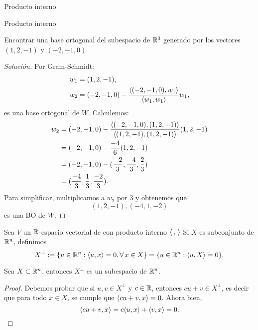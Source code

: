 \begin{chapter}{Producto interno}
\begin{section}{Producto interno}
        \begin{ejemplo*}
            Encontrar una base ortogonal del subespacio de $\mathbb R^3$ generado por los vectores $(1,2,-1)$ y $(-2,-1,0)$
            \begin{proof}[Solución] Por Gram-Schmidt:
                \begin{align*}
                w_1 &= (1,2,-1),  \\
                w_2 &= (-2,-1,0) - \frac{\langle (-2,-1,0),w_1\rangle}{\langle w_1,w_1\rangle}w_1,
                \end{align*}
                es una base ortogonal de $W$. Calculemos: 
                \begin{align*}
                    w_2  &= (-2,-1,0) - \frac{\langle (-2,-1,0),(1,2,-1)\rangle}{\langle(1,2,-1),(1,2,-1)\rangle}(1,2,-1)\\
                    &= (-2,-1,0) - \frac{-4}{6}(1,2,-1) \\
                    &= (-2,-1,0) - (\frac{-2}{3},\frac{-4}{3},\frac{2}{3}) \\
                    &= (\frac{-4}{3},\frac{1}{3},\frac{-2}{3}).
                \end{align*}
                Para simplificar, multiplicamos a $w_2$ por $3$ y obtenemos que
                \begin{equation*}
                    (1,2,-1), (-4,1,-2)
                \end{equation*} 
                es una BO de $W$. 
                
            \end{proof}  
        \end{ejemplo*}

        Sea $V$  un $\mathbb R$-espacio vectorial de con producto interno $\langle \,,\,\rangle$ Si $X$ es subconjunto de $\mathbb R^n$,  definimos 
        $$
        X^\perp := \{u \in \mathbb R^n: \langle u,x\rangle = 0, \forall\, x \in X\} = \{u \in \mathbb R^n: \langle u,X\rangle = 0\}.
        $$ 
        
        \begin{proposicion}
            Sea  $X \subset \mathbb R^n$, entonces $X^\perp$  es un subespacio de $\mathbb R^n$.
        \end{proposicion}
        \begin{proof}
            Debemos probar que si $u,v \in X^\perp$ y $c \in \mathbb R$,  entonces $cu+v \in X^\perp$,  es decir que para todo $x \in X$,  se cumple que  $\langle cu+v,x\rangle=0$. Ahora bien,
            $$
            \langle cu+v,x\rangle= c\langle u,x\rangle +\langle v,x\rangle= 0.
            $$
        \end{proof}
        

\end{section}
\end{chapter}
